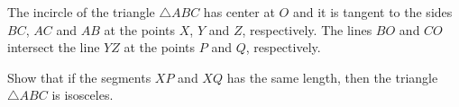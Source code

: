 The incircle of the triangle $\triangle{ABC}$ has center at $O$ and it is tangent to the sides $BC$,  $AC$ and $AB$ at the points $X$,  $Y$ and $Z$,  respectively. The lines $BO$ and $CO$ intersect the line $YZ$ at the points $P$ and $Q$,  respectively.

Show that if the segments $XP$ and $XQ$ has the same length, then the triangle $\triangle ABC$ is isosceles.